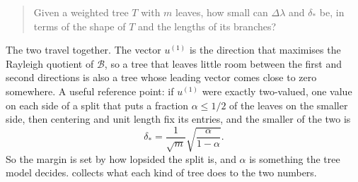 \documentclass[11pt]{article}
\begin{document}
\begin{quote}
Given a weighted tree $T$ with $m$ leaves, how small can $\Delta\lambda$ and $\delta_*$
be, in terms of the shape of $T$ and the lengths of its branches?
\end{quote}

The two travel together. The vector $u^{(1)}$ is the direction that maximises the Rayleigh
quotient of $\mathcal{B}$, so a tree that leaves little room between the first and second
directions is also a tree whose leading vector comes close to zero somewhere. A useful
reference point: if $u^{(1)}$ were exactly two-valued, one value on each side of a split
that puts a fraction $\alpha \le 1/2$ of the leaves on the smaller side, then centering and
unit length fix its entries, and the smaller of the two is
\begin{equation}
\label{eq:two-block-margin}
\delta_* = \frac{1}{\sqrt{m}}\sqrt{\frac{\alpha}{1-\alpha}} .
\end{equation}
So the margin is set by how lopsided the split is, and $\alpha$ is something the tree model
decides.  collects what each kind of tree does to the two numbers.
\end{document}
